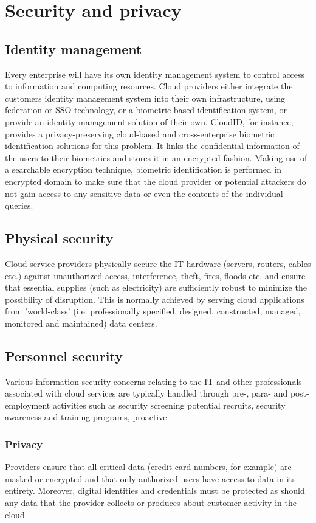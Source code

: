 \documentclass[11pt,a4paper]{report}
\begin{document}
\section{Security and privacy}
\subsection{Identity management }
Every enterprise will have its own identity management system to control access to information and computing resources.
Cloud providers either integrate the customers identity management system into their own infrastructure, using federation or SSO technology, or a biometric-based identification system, or provide an identity management solution of their own.
CloudID, for instance, provides a privacy-preserving cloud-based and cross-enterprise biometric identification solutions for this problem.
It links the confidential information of the users to their biometrics and stores it in an encrypted fashion.
Making use of a searchable encryption technique, biometric identification is performed in encrypted domain to make sure that the cloud provider or potential attackers do not gain access to any sensitive data or even the contents of the individual queries.
\subsection*{Physical security }
Cloud service providers physically secure the IT hardware (servers, routers, cables etc.)
against unauthorized access, interference, theft, fires, floods etc.
and ensure that essential supplies (such as electricity) are sufficiently robust to minimize the possibility of disruption.
This is normally achieved by serving cloud applications from 'world-class' (i.e. professionally specified, designed, constructed, managed, monitored and maintained) data centers.
\subsection*{Personnel security}
Various information security concerns relating to the IT and other professionals associated with cloud services are typically handled through pre-, para- and post-employment activities such as security screening potential recruits, security awareness and training programs, proactive
\subsubsection*{Privacy}
Providers ensure that all critical data (credit card numbers, for example) are masked or encrypted and that only authorized users have access to data in its entirety. Moreover, digital identities and credentials must be protected as should any data that the provider collects or produces about customer activity in the cloud.
\end{document}
